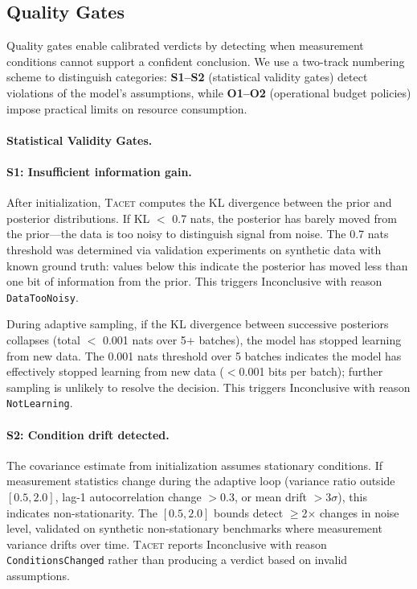 \documentclass[letterpaper,twocolumn,10pt]{article}
\newcommand{\tacet}{\textsc{Tacet}\xspace}
\begin{document}
\subsection{Quality Gates}
\label{sec:approach:gates}

Quality gates enable calibrated verdicts by detecting when measurement conditions
cannot support a confident conclusion. We use a two-track numbering scheme to
distinguish categories: \textbf{S1--S2} (statistical validity gates) detect
violations of the model's assumptions, while \textbf{O1--O2} (operational budget
policies) impose practical limits on resource consumption.

\paragraph{Statistical Validity Gates.}

\paragraph{S1: Insufficient information gain.}
After initialization, \tacet computes the KL divergence between the prior and
posterior distributions. If KL $<$ 0.7 nats, the posterior has barely moved
from the prior—the data is too noisy to distinguish signal from noise.
The 0.7 nats threshold was determined via validation experiments on synthetic
data with known ground truth: values below this indicate the posterior has
moved less than one bit of information from the prior.
This triggers Inconclusive with reason \texttt{DataTooNoisy}.

During adaptive sampling, if the KL divergence between successive posteriors
collapses (total $<$ 0.001 nats over 5+ batches), the model has stopped learning
from new data. The 0.001 nats threshold over 5 batches indicates the model has
effectively stopped learning from new data ($<$0.001 bits per batch); further
sampling is unlikely to resolve the decision. This triggers Inconclusive with
reason \texttt{NotLearning}.

\paragraph{S2: Condition drift detected.}
The covariance estimate from initialization assumes stationary conditions. If
measurement statistics change during the adaptive loop (variance ratio outside
$[0.5, 2.0]$, lag-1 autocorrelation change $>0.3$, or mean drift $>3\sigma$),
this indicates non-stationarity. The $[0.5, 2.0]$ bounds detect $\geq$2$\times$
changes in noise level, validated on synthetic non-stationary benchmarks where
measurement variance drifts over time. \tacet reports Inconclusive with reason
\texttt{ConditionsChanged} rather than producing a verdict based on invalid
assumptions.
\end{document}
